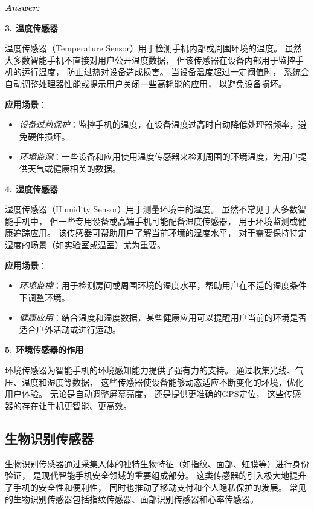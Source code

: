 \documentclass[12pt]{article}
\newenvironment{Answer}{
  \vspace{12pt}
  {\large\textbf{\textit{\hspace{-12pt}Answer:}}}\par
  \vspace{8pt}
} {\vspace{24pt}}
\begin{document}
\begin{Answer}
\noindent\textbf{3. 温度传感器}\noindent

温度传感器（Temperature Sensor）用于检测手机内部或周围环境的温度。
虽然大多数智能手机不直接对用户公开温度数据，
但该传感器在设备内部用于监控手机的运行温度，
防止过热对设备造成损害。
当设备温度超过一定阈值时，
系统会自动调整处理器性能或提示用户关闭一些高耗能的应用，
以避免设备损坏。

\textbf{应用场景}：
\begin{itemize}
    \item \textit{设备过热保护}：监控手机的温度，在设备温度过高时自动降低处理器频率，避免硬件损坏。
    \item \textit{环境监测}：一些设备和应用使用温度传感器来检测周围的环境温度，为用户提供天气或健康相关的数据。
\end{itemize}

\noindent\textbf{4. 湿度传感器}\noindent

湿度传感器（Humidity Sensor）用于测量环境中的湿度。
虽然不常见于大多数智能手机中，
但一些专用设备或高端手机可能配备湿度传感器，
用于环境监测或健康追踪应用。
该传感器可帮助用户了解当前环境的湿度水平，
对于需要保持特定湿度的场景（如实验室或温室）尤为重要。

\textbf{应用场景}：
\begin{itemize}
    \item \textit{环境监控}：用于检测房间或周围环境的湿度水平，帮助用户在不适的湿度条件下调整环境。
    \item \textit{健康应用}：结合温度和湿度数据，某些健康应用可以提醒用户当前的环境是否适合户外活动或进行运动。
\end{itemize}

\noindent\textbf{5. 环境传感器的作用}\noindent

环境传感器为智能手机的环境感知能力提供了强有力的支持。
通过收集光线、气压、温度和湿度等数据，
这些传感器使设备能够动态适应不断变化的环境，优化用户体验。
无论是自动调整屏幕亮度，
还是提供更准确的GPS定位，
这些传感器的存在让手机更智能、更高效。

\subsection*{生物识别传感器}\noindent

生物识别传感器通过采集人体的独特生物特征（如指纹、面部、虹膜等）进行身份验证，
是现代智能手机安全领域的重要组成部分。
这类传感器的引入极大地提升了手机的安全性和便利性，
同时也推动了移动支付和个人隐私保护的发展。
常见的生物识别传感器包括指纹传感器、面部识别传感器和心率传感器。


\end{Answer}
\end{document}
